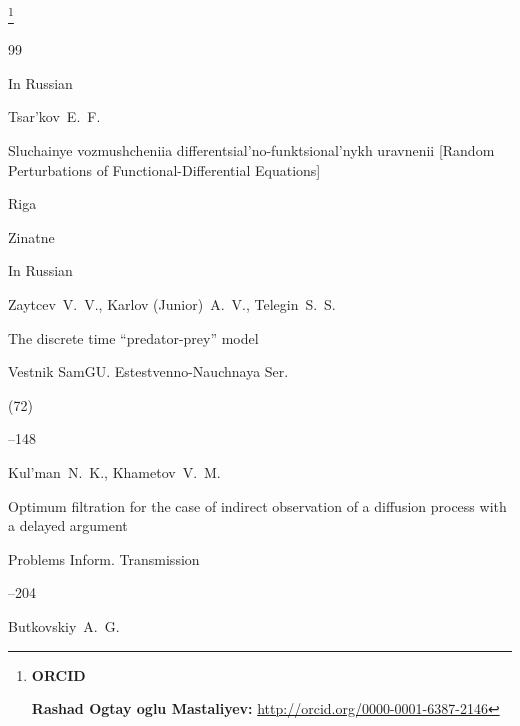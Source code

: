 \thanks{{\bf ORCID}



{\bf Rashad Ogtay oglu Mastaliyev:} \url{http://orcid.org/0000-0001-6387-2146}



}



\EngRef





\begin{thebibliography}{99}




\lang In Russian

\by Tsar'kov~E.~F.

\book  Sluchainye vozmushcheniia differentsial'no-funktsional'nykh uravnenii \rm [Random Perturbations of Functional-Differential Equations]

\publaddr Riga

\publ Zinatne 








\lang In Russian

\by Zaytcev~V.~V., Karlov (Junior)~A.~V., Telegin~S.~S.

\paper The discrete time ``predator-prey'' model

\jour Vestnik SamGU. Estestvenno-Nauchnaya Ser.


(72)

--148




\by Kul'man~N.~K., Khametov~V.~M.

\paper Optimum filtration for the case of indirect observation of a diffusion process with a delayed argument

\jour Problems Inform. Transmission




--204




\by Butkovskiy~A.~G.


\end{thebibliography}
